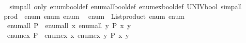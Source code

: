 \begin{isabellebody}
\isanewline
{}\isamarkupfalse%
%
\isadelimproof
\ %
\endisadelimproof
%
\isatagproof
{}\isamarkupfalse%
\isanewline
{}\isamarkupfalse%
\ {\isacharparenleft}{\kern0pt}simp{\isacharunderscore}{\kern0pt}all\ only{\isacharcolon}{\kern0pt}\ enum{\isacharunderscore}{\kern0pt}bool{\isacharunderscore}{\kern0pt}def\ enum{\isacharunderscore}{\kern0pt}all{\isacharunderscore}{\kern0pt}bool{\isacharunderscore}{\kern0pt}def\ enum{\isacharunderscore}{\kern0pt}ex{\isacharunderscore}{\kern0pt}bool{\isacharunderscore}{\kern0pt}def\ UNIV{\isacharunderscore}{\kern0pt}bool{\isacharcomma}{\kern0pt}\ simp{\isacharunderscore}{\kern0pt}all{\isacharparenright}{\kern0pt}%
\endisatagproof
{\isafoldproof}%
%
\isadelimproof
%
\endisadelimproof
\isanewline
\isanewline
{}\isamarkupfalse%
\isanewline
\isanewline
{}\isamarkupfalse%
\ prod\ {\isacharcolon}{\kern0pt}{\isacharcolon}{\kern0pt}\ {\isacharparenleft}{\kern0pt}enum{\isacharcomma}{\kern0pt}\ enum{\isacharparenright}{\kern0pt}\ enum\isanewline
{}\isanewline
\isanewline
{}\isamarkupfalse%
\isanewline
\ \ {\isachardoublequoteopen}enum\ {\isacharequal}{\kern0pt}\ List{\isachardot}{\kern0pt}product\ enum\ enum{\isachardoublequoteclose}\isanewline
\isanewline
{}\isamarkupfalse%
\isanewline
\ \ {\isachardoublequoteopen}enum{\isacharunderscore}{\kern0pt}all\ P\ {\isacharequal}{\kern0pt}\ enum{\isacharunderscore}{\kern0pt}all\ {\isacharparenleft}{\kern0pt}{\isacharpercent}{\kern0pt}x{\isachardot}{\kern0pt}\ enum{\isacharunderscore}{\kern0pt}all\ {\isacharparenleft}{\kern0pt}{\isacharpercent}{\kern0pt}y{\isachardot}{\kern0pt}\ P\ {\isacharparenleft}{\kern0pt}x{\isacharcomma}{\kern0pt}\ y{\isacharparenright}{\kern0pt}{\isacharparenright}{\kern0pt}{\isacharparenright}{\kern0pt}{\isachardoublequoteclose}\isanewline
\isanewline
{}\isamarkupfalse%
\isanewline
\ \ {\isachardoublequoteopen}enum{\isacharunderscore}{\kern0pt}ex\ P\ {\isacharequal}{\kern0pt}\ enum{\isacharunderscore}{\kern0pt}ex\ {\isacharparenleft}{\kern0pt}{\isacharpercent}{\kern0pt}x{\isachardot}{\kern0pt}\ enum{\isacharunderscore}{\kern0pt}ex\ {\isacharparenleft}{\kern0pt}{\isacharpercent}{\kern0pt}y{\isachardot}{\kern0pt}\ P\ {\isacharparenleft}{\kern0pt}x{\isacharcomma}{\kern0pt}\ y{\isacharparenright}{\kern0pt}{\isacharparenright}{\kern0pt}{\isacharparenright}{\kern0pt}{\isachardoublequoteclose}\isanewline
\isanewline
\ \isanewline
{}\isamarkupfalse%
\isanewline
%
\isadelimproof
\ \ %
\endisadelimproof

\end{isabellebody}

